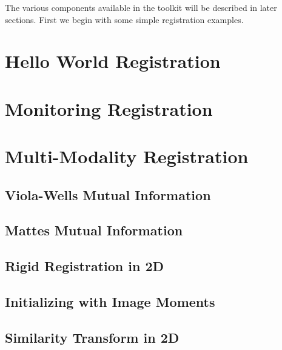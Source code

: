 The various components available in the toolkit will be described in later sections.
First we begin with some simple registration examples.

\section{Hello World Registration}
\label{sec:IntroductionImageRegistration}


\section{Monitoring Registration}
\label{sec:MonitoringImageRegistration}




\section{Multi-Modality Registration}
\label{sec:MultiModalityRegistration}

\subsection{Viola-Wells Mutual Information}
\label{sec:MultiModalityRegistrationViolaWells}


\subsection{Mattes Mutual Information}
\label{sec:MultiModalityRegistrationMattes}


\subsection{Rigid Registration in 2D}
\label{sec:RigidRegistrationIn2D}


\subsection{Initializing with Image Moments}
\label{sec:InitializingRegistrationWithMoments}


\subsection{Similarity Transform in 2D}
\label{sec:SimilarityRegistrationIn2D}





